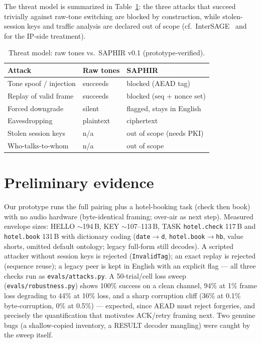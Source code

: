 \documentclass[10pt,twocolumn]{article}
\begin{document}
The threat model is summarized in Table~\ref{tab:threat}: the three attacks that
succeed trivially against raw-tone switching are blocked by construction, while
stolen-session keys and traffic analysis are declared out of scope (cf.\
InterSAGE~\cite{intersage} and~\cite{graphmeta} for the IP-side treatment).

\begin{table}[h]
\centering\small
\caption{Threat model: raw tones vs.\ SAPHIR v0.1 (prototype-verified).}
\label{tab:threat}
\begin{tabular}{@{}lll@{}}
\toprule
Attack & Raw tones & SAPHIR \\
\midrule
Tone spoof / injection & succeeds & blocked (AEAD tag) \\
Replay of valid frame & succeeds & blocked (seq + nonce set) \\
Forced downgrade & silent & flagged, stays in English \\
Eavesdropping & plaintext & ciphertext \\
Stolen session keys & n/a & out of scope (needs PKI) \\
Who-talks-to-whom & n/a & out of scope \\
\bottomrule
\end{tabular}
\end{table}

\section{Preliminary evidence}
Our prototype runs the full pairing plus a hotel-booking task (check then book)
with no audio hardware (byte-identical framing; over-air as next step).
Measured envelope sizes: HELLO $\sim$194\,B, KEY $\sim$107--113\,B,
TASK \texttt{hotel.check} 117\,B and \texttt{hotel.book} 131\,B with dictionary
coding (\texttt{date}$\to$\texttt{d}, \texttt{hotel.book}$\to$\texttt{hb}, value
shorts, omitted default ontology; legacy full-form still decodes). A scripted attacker without session keys is
rejected (\texttt{InvalidTag}); an exact replay is rejected (sequence reuse);
a legacy peer is kept in English with an explicit flag ---
all three checks run as \texttt{evals/attacks.py}.
A 50-trial/cell loss sweep (\texttt{evals/robustness.py}) shows 100\% success
on a clean channel, 94\% at 1\% frame loss degrading to 44\% at 10\% loss, and
a sharp corruption cliff (36\% at 0.1\% byte-corruption, 0\% at 0.5\%) ---
expected, since AEAD must reject forgeries, and precisely the quantification
that motivates ACK/retry framing next. Two genuine bugs (a shallow-copied
inventory, a RESULT decoder mangling) were caught by the sweep itself.
\end{document}
